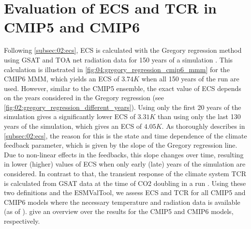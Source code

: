 \section{Evaluation of \acs{ECS} and \acs{TCR} in \acs{CMIP}5 and \acs{CMIP}6}
\label{sec:04:evaluation_ecs_and_tcr}

Following \cref{subsec:02:ecs}, \ac{ECS} is calculated with the Gregory
regression method using \ac{GSAT} and \ac{TOA} net radiation data for 150 years
of a  simulation \autocite{Gregory2004}. This calculation is
illustrated in \cref{fig:04:gregory_regression_cmip6_mmm} for the \acs{CMIP}6
\ac{MMM}, which yields an \ac{ECS} of $3.74 \unit{K}$ when all 150 years of the
run are used. However, similar to the \acs{CMIP}5 ensemble, the exact value of
\ac{ECS} depends on the years considered in the Gregory regression (see
\cref{fig:02:gregory_regression_different_years}). Using only the first 20
years of the simulation gives a significantly lower \ac{ECS} of $3.31 \unit{K}$
than using only the last 130 years of the simulation, which gives an \ac{ECS}
of $4.05 \unit{K}$. As thoroughly describes in \cref{subsec:02:ecs}, the reason
for this is the state and time dependence of the climate feedback parameter,
which is given by the slope of the Gregory regression line. Due to non-linear
effects in the feedbacks, this slope changes over time, resulting in lower
(higher) values of \ac{ECS} when only early (late) years of the simulation are
considered. In contrast to that, the transient response of the climate system
\ac{TCR} is calculated from \ac{GSAT} data at the time of \ac{CO2} doubling in
a \onepctcotwo{} run . Using
these two definitions and the \ac{ESMValTool}, we assess \ac{ECS} and \ac{TCR}
for all \acs{CMIP}5 and \acs{CMIP}6 models where the necessary temperature and
radiation data is available (as of \TheMonth{}).
 give an overview over the
results for the \acs{CMIP}5 and \acs{CMIP}6 models, respectively.

